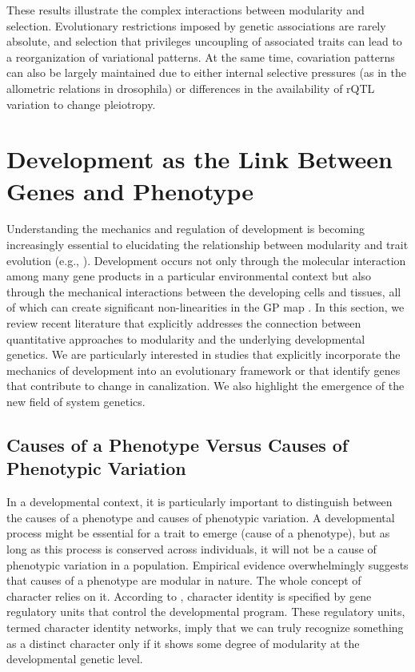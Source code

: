 \begin{refsection}
These results illustrate the complex interactions between modularity and
selection. Evolutionary restrictions imposed by genetic associations are
rarely absolute, and selection that privileges uncoupling of associated
traits can lead to a reorganization of variational patterns. At the same
time, covariation patterns can also be largely maintained due to either
internal selective pressures (as in the allometric relations in
drosophila) or differences in the availability of rQTL variation to
change pleiotropy.

\section{Development as the Link Between Genes and Phenotype}

Understanding the mechanics and regulation of development is becoming
increasingly essential to elucidating the relationship between
modularity and trait evolution (e.g., \textcite{Salazar-Ciudad2010-wc}).
Development occurs not only through the molecular interaction among many
gene products in a particular environmental context but also through the
mechanical interactions between the developing cells and tissues, all of
which can create significant non-linearities in the GP map \parencite{Alberch1991-sf, Polly2008-bb, Watson2014-pi}. 
In this section, we review recent literature that explicitly addresses the connection
between quantitative approaches to modularity and the underlying
developmental genetics. We are particularly interested in studies that
explicitly incorporate the mechanics of development into an evolutionary
framework or that identify genes that contribute to change in
canalization. We also highlight the emergence of the new field of system
genetics.

\subsection{Causes of a Phenotype Versus Causes of Phenotypic Variation}

In a developmental context, it is particularly important to distinguish
between the causes of a phenotype and causes of phenotypic variation. A
developmental process might be essential for a trait to emerge (cause of
a phenotype), but as long as this process is conserved across
individuals, it will not be a cause of phenotypic variation in a
population. Empirical evidence overwhelmingly suggests that causes of a
phenotype are modular in nature. The whole concept of character relies
on it. According to \textcite{Wagner2007-zs},
character identity is specified by gene regulatory units that control
the developmental program. These regulatory units, termed character
identity networks, imply that we can truly recognize something as a
distinct character only if it shows some degree of modularity at the
developmental genetic level.


\end{refsection}

